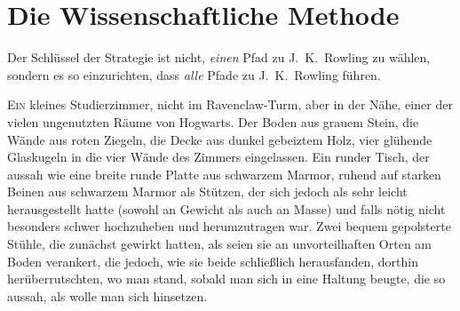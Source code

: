 \chapter{Die Wissenschaftliche Methode}

\begin{chapterOpeningAuthorNote}
Der Schlüssel der Strategie ist nicht, \emph{einen} Pfad zu J.~K.~Rowling zu wählen, sondern es so einzurichten, dass \emph{alle} Pfade zu J.~K.~Rowling führen.
\end{chapterOpeningAuthorNote}

\lettrine{E}{in} kleines Studierzimmer, nicht im Ravenclaw-Turm, aber in der Nähe, einer der vielen ungenutzten Räume von Hogwarts. Der Boden aus grauem Stein, die Wände aus roten Ziegeln, die Decke aus dunkel gebeiztem Holz, vier glühende Glaskugeln in die vier Wände des Zimmers eingelassen. Ein runder Tisch, der aussah wie eine breite runde Platte aus schwarzem Marmor, ruhend auf starken Beinen aus schwarzem Marmor als Stützen, der sich jedoch als sehr leicht herausgestellt hatte (sowohl an Gewicht als auch an Masse) und falls nötig nicht besonders schwer hochzuheben und herumzutragen war. Zwei bequem gepolsterte Stühle, die zunächst gewirkt hatten, als seien sie an unvorteilhaften Orten am Boden verankert, die jedoch, wie sie beide schließlich herausfanden, dorthin herüberrutschten, wo man stand, sobald man sich in eine Haltung beugte, die so aussah, als wolle man sich hinsetzen.

